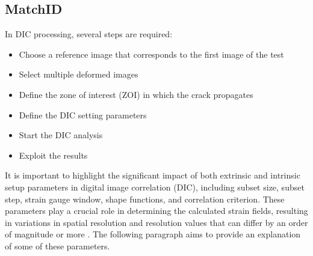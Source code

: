 \subsection{MatchID}

In DIC processing, several steps are required:

\begin{itemize}
	\item Choose a reference image that corresponds to the first image of the test 
	\item Select multiple deformed images
	\item Define the zone of interest (ZOI) in which the crack propagates
	\item Define the  DIC setting parameters
	\item Start the DIC analysis
	\item Exploit the results
\end{itemize}

It is important to highlight the significant impact of both extrinsic and intrinsic setup parameters in digital image correlation (DIC), including subset size, subset step, strain gauge window, shape functions, and correlation criterion. These parameters play a crucial role in determining the calculated strain fields, resulting in variations in spatial resolution and resolution values that can differ by an order of magnitude or more \citep{DICguide2018}. The following paragraph aims to provide an explanation of some of these parameters.

